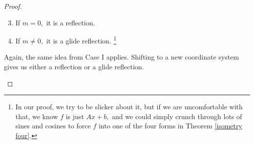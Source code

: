 \begin{proof}
\begin{itemize}
\begin{enumerate}
    \setcounter{enumi}{2}
    \item If $m = 0,$ it is a reflection. 
    \item If $m \neq 0,$ it is a glide reflection. \footnote{In our proof, we try to be slicker about it, but if we are uncomfortable with that, we know $f$ is just $Ax + b,$ and we could simply crunch through lots of sines and cosines to force $f$ into one of the four forms in Theorem \ref{isometry four}.}

\end{enumerate}

Again, the same idea from Case I applies. Shifting to a new coordinate system gives us either a reflection or a glide reflection.

\end{itemize}

\end{proof}


\newpage